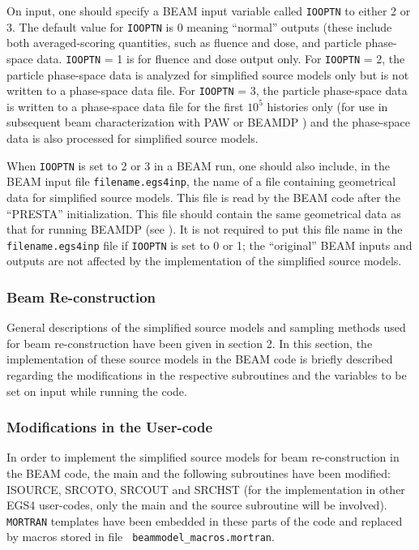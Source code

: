 \documentclass[12pt,twoside]{article}
\begin{document}
On input, one should specify a BEAM input variable called {\tt IOOPTN}
to either 2 or 3. The default value for {\tt IOOPTN} is 0 meaning
``normal'' outputs (these include both averaged-scoring quantities, such
as fluence and dose,  and particle phase-space data. {\tt IOOPTN} = 1 is for
fluence and dose output only. For {\tt IOOPTN} = 2, the particle phase-space
data is analyzed for simplified source models only but is not written to a
phase-space data file. For {\tt IOOPTN} = 3, the particle phase-space data is
written to a phase-space data file for the first $10^5$ histories only
(for use in subsequent beam characterization with PAW or BEAMDP
\cite{MR95b}) and the phase-space data is also processed for simplified
source models.

When {\tt IOOPTN} is set to 2 or 3 in a BEAM run, one should also include, in
the BEAM input file {\tt filename.egs4inp}, the name of a file containing
geometrical data for simplified source models. This file is read by the
BEAM code after the ``PRESTA'' initialization. This file should contain
the same geometrical data as that for running BEAMDP (see \cite{MR95a}).
It is not required to put this file name in the  {\tt filename.egs4inp}
file if {\tt IOOPTN} is set to 0 or 1; the ``original'' BEAM inputs and outputs
are not affected by the implementation of the simplified source models.

\subsubsection{Beam Re-construction} General descriptions of the
simplified source models and sampling methods used for beam
re-construction have been given in section 2. In this section, the
implementation of these source models in the BEAM code is briefly
described regarding the modifications in the respective subroutines and
the variables to be set on input while running the code.
\subsubsection{Modifications in the User-code}

In order to implement the simplified source models for beam
re-construction in the BEAM code, the main and the following subroutines
have been modified: ISOURCE, SRCOTO, SRCOUT and SRCHST (for the
implementation in other EGS4 user-codes, only the main and the source
subroutine will be involved). {\tt MORTRAN} templates have been embedded
in these parts of the code and replaced by macros stored in file {\tt
beammodel\_macros.mortran}.
\end{document}
